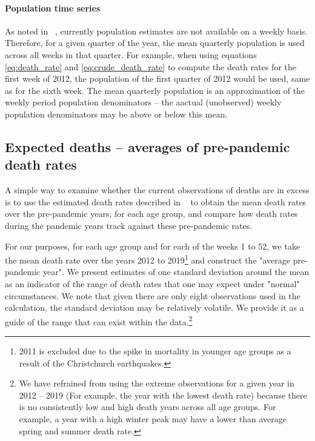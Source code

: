 \documentclass[
10pt, %
a4paper, %
oneside, %
DIV=16,
parskip=full,
headinclude,footinclude %
]{scrartcl}
\begin{document}
\paragraph{Population time series} As noted in ~, currently population estimates are not available on a weekly basis. Therefore, for a given quarter of the year, the mean quarterly population is used across all weeks in that quarter. For example, when using equations \eqref{eq:death_rate} and \eqref{eq:crude_death_rate} to compute the death rates for the first week of 2012, the population of the first quarter of 2012 would be used, same as for the sixth week. The mean quarterly population is an approximation of the weekly period population denominators -- the aactual (unobserved) weekly population denominators may be above or below this mean.

\subsection{Expected deaths -- averages of pre-pandemic death rates}
\label{subsec:average_deaths}

A simple way to examine whether the current observations of deaths are in excess is to use the estimated death rates described in ~ to obtain the mean death rates over the pre-pandemic years, for each age group, and compare how death rates during the pandemic years track against these pre-pandemic rates. 

For our purposes, for each age group and for each of the weeks 1 to 52, we take the mean death rate over the years 2012 to 2019\footnote{2011 is excluded due to the spike in mortality in younger age groups as a result of the Christchurch earthquakes.} and construct the "average pre-pandemic year". We present estimates of one standard deviation around the mean as an indicator of the range of death rates that one may expect under "normal" circumstances. We note that given there are only eight observations used in the calculation, the standard deviation may be relatively volatile. We provide it as a guide of the range that can exist within the data.\footnote{We have refrained from using the extreme observations for a given year in 2012 -- 2019 (For example, the year with the lowest death rate) because there is no consistently low and high death years across all age groups. For example, a year with a high winter peak may have a lower than average spring and summer death rate.}
\end{document}
